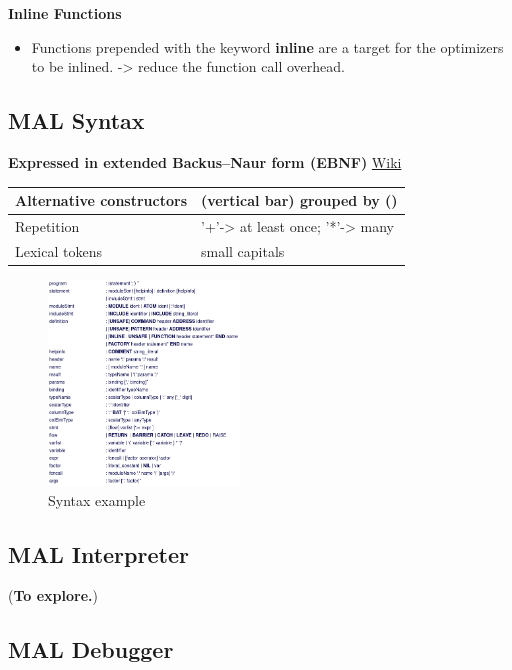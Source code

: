 \documentclass[11pt]{article}
\begin{document}
\textbf{Inline Functions}
\begin{itemize}
\item Functions prepended with the keyword \textbf{inline} are a target for the optimizers to be inlined. -> reduce the function call overhead.
\end{itemize}

\subsection{MAL Syntax}
\label{sec:orgfcd0ed6}

\textbf{Expressed in extended Backus–Naur form (EBNF)} \href{https://en.wikipedia.org/wiki/Extended\_Backus\%E2\%80\%93Naur\_form}{Wiki}

\begin{center}
\begin{tabular}{ll}
\hline
Alternative constructors & (vertical bar) grouped by ()\\
\hline
Repetition & '+'-> at least once; '*'-> many\\
\hline
Lexical tokens & small capitals\\
\hline
\end{tabular}
\end{center}

\begin{figure}[htbp]
\centering
\includegraphics[width=2.0in]{./Pictures/syntax.png}
\caption{\label{fig:org6f44628}
Syntax example}
\end{figure}

\subsection{MAL Interpreter}
\label{sec:org6d6bedf}

(\textbf{To explore.})

\subsection{MAL Debugger}
\label{sec:org920ec76}
\end{document}
